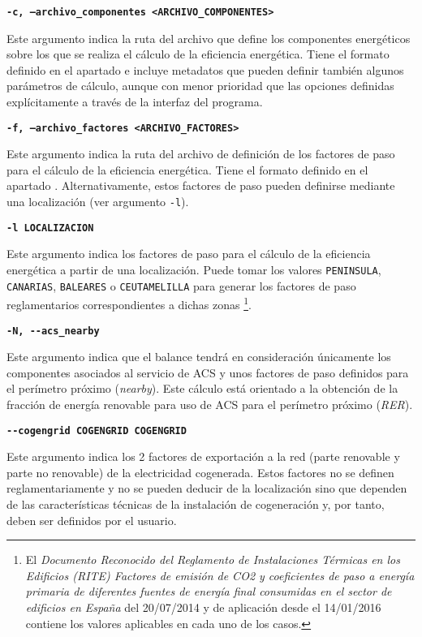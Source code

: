 \documentclass[10pt,notitlepage,oneside,a4paper]{article}
\begin{document}
\textbf{\texttt{-c, --archivo\_componentes <ARCHIVO\_COMPONENTES>}}

Este argumento indica la ruta del archivo que define los componentes energéticos sobre los que se realiza el cálculo de la eficiencia energética. Tiene el formato definido en el apartado  e incluye metadatos que pueden definir también algunos parámetros de cálculo, aunque con menor prioridad que las opciones definidas explícitamente a través de la interfaz del programa.

\textbf{\texttt{-f, --archivo\_factores <ARCHIVO\_FACTORES>}}

Este argumento indica la ruta del archivo de definición de los factores de paso para el cálculo de la eficiencia energética. Tiene el formato definido en el apartado .
Alternativamente, estos factores de paso pueden definirse mediante una localización (ver argumento \texttt{-l}).

\textbf{\texttt{-l LOCALIZACION}}

Este argumento indica los factores de paso para el cálculo de la eficiencia energética a partir de una localización. Puede tomar los valores \texttt{PENINSULA}, \texttt{CANARIAS}, \texttt{BALEARES} o \texttt{CEUTAMELILLA} para generar los factores de paso reglamentarios correspondientes a dichas zonas \footnote{El \textit{Documento Reconocido del Reglamento de Instalaciones Térmicas en los Edificios (RITE) Factores de emisión de CO2 y coeficientes de paso a energía primaria de diferentes fuentes de energía final consumidas en el sector de edificios en España} del 20/07/2014 y de aplicación desde el 14/01/2016 contiene los valores aplicables en cada uno de los casos.}.

\textbf{\texttt{-N, -{}-acs\_nearby}}

Este argumento indica que el balance tendrá en consideración únicamente los componentes asociados al servicio de ACS y unos factores de paso definidos para el perímetro próximo (\textit{nearby}). Este cálculo está orientado a la obtención de la fracción de energía renovable para uso de ACS para el perímetro próximo (\textit{RER}).

\textbf{\texttt{-{}-cogengrid COGENGRID COGENGRID}}

Este argumento indica los 2 factores de exportación a la red (parte renovable y parte no renovable) de la electricidad cogenerada. Estos factores no se definen reglamentariamente y no se pueden deducir de la localización sino que dependen de las características técnicas de la instalación de cogeneración y, por tanto, deben ser definidos por el usuario.
\end{document}
